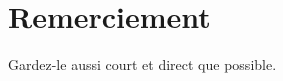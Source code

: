 \chapter*{\hfill Remerciement \hfill}

\vspace{3cm}

\begin{center}
Gardez-le aussi court et direct que possible.

\end{center}